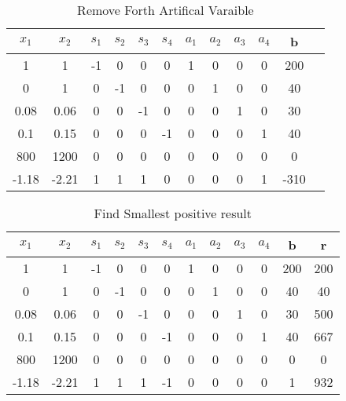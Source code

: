 \documentclass{article}
\begin{document}
  \begin{table}[H]
  \centering
  \caption{Remove Forth Artifical Varaible}
  \label{my-label}
  \begin{tabular}{|c|c|c|c|c|c|c|c|c|c|c|c|}
  \hline
  $x_1$ & $x_2$ & $s_1$  & $s_2$ & $s_3$ & $s_4$ & $a_1$ & $a_2$ & $a_3$ & $a_4$ & b  \\ \hline
  1    & 1    & -1       & 0    & 0    & 0    & 1    & 0    & 0    & 0 & 200 \\ \hline
  0    & 1    & 0        & -1   & 0    & 0    & 0    & 1    & 0    & 0 & 40  \\ \hline
  0.08 & 0.06 & 0        & 0    & -1   & 0    & 0    & 0    & 1    & 0 & 30  \\ \hline
  0.1  & 0.15 & 0        & 0    & 0    & -1   & 0    & 0    & 0    & 1 & 40  \\ \hline
  800  & 1200 & 0        & 0    & 0    & 0    & 0    & 0    & 0    & 0 & 0   \\ \hline
  -1.18 & -2.21  & 1     & 1    & 1    & 0    & 0    & 0    & 0    & 1 & -310   \\ \hline
  \end{tabular}
  \end{table}

  \begin{table}[H]
  \centering
  \caption{Find Smallest positive result}
  \label{my-label}
  \begin{tabular}{|c|c|c|c|c|c|c|c|c|c|c|c|}
  \hline
  $x_1$ & $x_2$ & $s_1$  & $s_2$ & $s_3$ & $s_4$ & $a_1$ & $a_2$ & $a_3$ & $a_4$ & b & r  \\ \hline
  1    & 1    & -1       & 0    & 0    & 0    & 1    & 0    & 0    & 0 & 200  & 200\\ \hline
  0    & 1    & 0        & -1   & 0    & 0    & 0    & 1    & 0    & 0 & 40   & 40\\ \hline
  0.08 & 0.06 & 0        & 0    & -1   & 0    & 0    & 0    & 1    & 0 & 30   & 500\\ \hline
  0.1  & 0.15 & 0        & 0    & 0    & -1   & 0    & 0    & 0    & 1 & 40   & 667\\ \hline
  800  & 1200 & 0        & 0    & 0    & 0    & 0    & 0    & 0    & 0 & 0    & 0\\ \hline
  -1.18 & -2.21  & 1     & 1    & 1    & -1   & 0    & 0    & 0    & 0    & 1 & 932   \\ \hline
  \end{tabular}
  \end{table}
\end{document}
